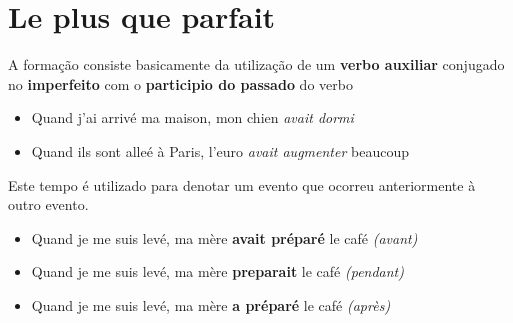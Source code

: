 \section{Le plus que parfait}

\begin{namedtheorem}[Formação]
  A formação consiste basicamente da utilização de um \textbf{verbo auxiliar} conjugado no \textbf{imperfeito} com o \textbf{participio do passado} do verbo
  \begin{itemize}
  	\item Quand j'ai arrivé ma maison, mon chien \textit{avait dormi}
  	\item Quand ils sont alleé à Paris, l'euro \textit{avait augmenter} beaucoup
  \end{itemize}
\end{namedtheorem}

\begin{namedtheorem}[Uso]
  Este tempo é utilizado para denotar um evento que ocorreu anteriormente à outro evento.
  \begin{itemize}
  	\item Quand je me suis levé, ma mère \textbf{avait préparé} le café \textit{(avant)}
  	\item Quand je me suis levé, ma mère \textbf{preparait} le café \textit{(pendant)}
  	\item Quand je me suis levé, ma mère \textbf{a préparé} le café \textit{(après)}
  \end{itemize}
\end{namedtheorem}